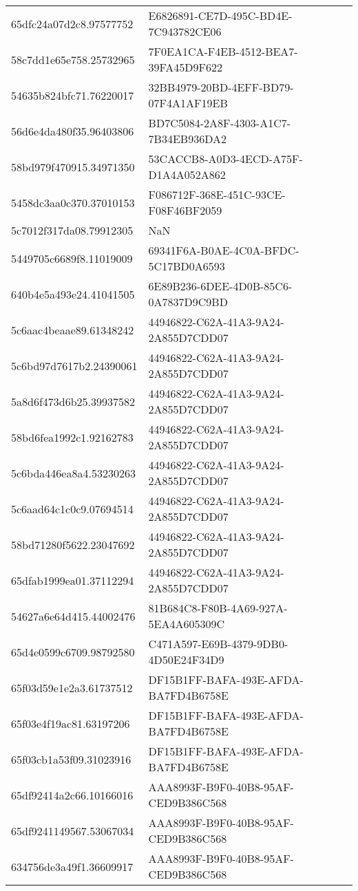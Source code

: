 \begin{tabular}{ll}
65dfc24a07d2c8.97577752 & E6826891-CE7D-495C-BD4E-7C943782CE06 \\
58c7dd1e65e758.25732965 & 7F0EA1CA-F4EB-4512-BEA7-39FA45D9F622 \\
54635b824bfc71.76220017 & 32BB4979-20BD-4EFF-BD79-07F4A1AF19EB \\
56d6e4da480f35.96403806 & BD7C5084-2A8F-4303-A1C7-7B34EB936DA2 \\
58bd979f470915.34971350 & 53CACCB8-A0D3-4ECD-A75F-D1A4A052A862 \\
5458dc3aa0c370.37010153 & F086712F-368E-451C-93CE-F08F46BF2059 \\
5c7012f317da08.79912305 & NaN \\
5449705c6689f8.11019009 & 69341F6A-B0AE-4C0A-BFDC-5C17BD0A6593 \\
640b4e5a493e24.41041505 & 6E89B236-6DEE-4D0B-85C6-0A7837D9C9BD \\
5c6aac4beaae89.61348242 & 44946822-C62A-41A3-9A24-2A855D7CDD07 \\
5c6bd97d7617b2.24390061 & 44946822-C62A-41A3-9A24-2A855D7CDD07 \\
5a8d6f473d6b25.39937582 & 44946822-C62A-41A3-9A24-2A855D7CDD07 \\
58bd6fea1992c1.92162783 & 44946822-C62A-41A3-9A24-2A855D7CDD07 \\
5c6bda446ea8a4.53230263 & 44946822-C62A-41A3-9A24-2A855D7CDD07 \\
5c6aad64c1c0c9.07694514 & 44946822-C62A-41A3-9A24-2A855D7CDD07 \\
58bd71280f5622.23047692 & 44946822-C62A-41A3-9A24-2A855D7CDD07 \\
65dfab1999ea01.37112294 & 44946822-C62A-41A3-9A24-2A855D7CDD07 \\
54627a6e64d415.44002476 & 81B684C8-F80B-4A69-927A-5EA4A605309C \\
65d4e0599c6709.98792580 & C471A597-E69B-4379-9DB0-4D50E24F34D9 \\
65f03d59e1e2a3.61737512 & DF15B1FF-BAFA-493E-AFDA-BA7FD4B6758E \\
65f03e4f19ac81.63197206 & DF15B1FF-BAFA-493E-AFDA-BA7FD4B6758E \\
65f03cb1a53f09.31023916 & DF15B1FF-BAFA-493E-AFDA-BA7FD4B6758E \\
65df92414a2c66.10166016 & AAA8993F-B9F0-40B8-95AF-CED9B386C568 \\
65df9241149567.53067034 & AAA8993F-B9F0-40B8-95AF-CED9B386C568 \\
634756de3a49f1.36609917 & AAA8993F-B9F0-40B8-95AF-CED9B386C568 \\

\end{tabular}
